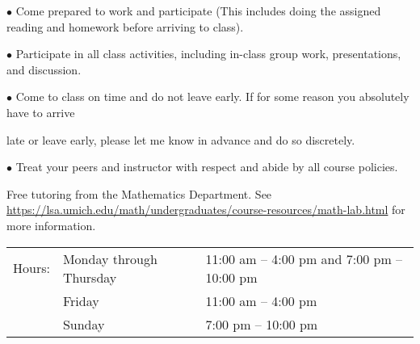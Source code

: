 \documentclass[11pt,twoside]{article}
\newcommand\topic[1]{\noindent{\bf #1}}
\begin{document}
\hspace{-1ex}$\bullet$ Come prepared to work and participate (This includes doing the assigned reading and homework before arriving to class).

\hspace{-1ex}$\bullet$ Participate in all class activities, including in-class group work, presentations, and discussion.

\hspace{-1ex}$\bullet$ Come to class on time and do not leave early.  
If for some reason you absolutely have to arrive 

\hspace{1ex}late or leave early, please let me know in advance and do so discretely.

\hspace{-1ex}$\bullet$ Treat your peers and instructor with respect and abide by all course policies.

\vspace{7pt}

\topic{Math Lab:}  Free tutoring from the Mathematics
Department. See \url{https://lsa.umich.edu/math/undergraduates/course-resources/math-lab.html} for more information.

\begin{tabular}{lll}
Hours: & Monday through Thursday & 11:00 am -- 4:00 pm and 7:00 pm -- 10:00 pm \\ 
       &         Friday 			& 11:00 am -- 4:00 pm\\
       &         Sunday 			& 7:00 pm -- 10:00 pm \\ 
\end{tabular}

\vspace{7pt}



\end{document}
